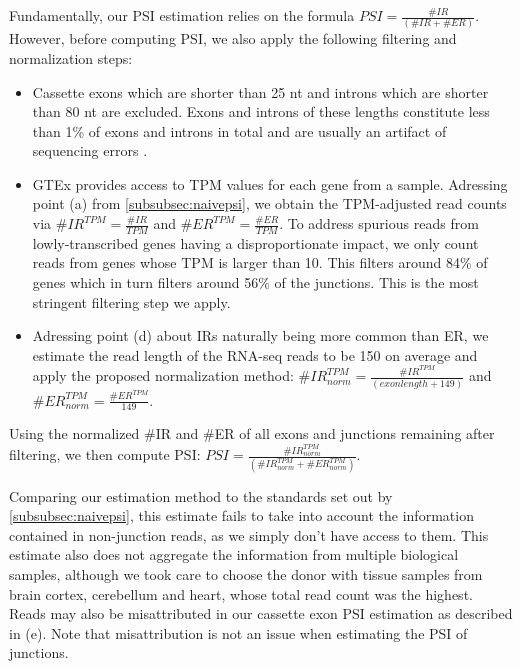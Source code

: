 Fundamentally, our PSI estimation relies on the formula $PSI = \frac{\#IR}{(\#IR+\#ER)}$. However, before computing PSI, we also apply the following filtering and normalization steps:
\begin{itemize}
	\item Cassette exons which are shorter than 25 nt and introns which are shorter than 80 nt are excluded. Exons and introns of these lengths constitute less than 1\% of exons and introns in total and are usually an artifact of sequencing errors \cite{dsc}.
	\item GTEx provides access to TPM values for each gene from a sample. Adressing point (a) from \ref{subsubsec:naivepsi}, we obtain the TPM-adjusted read counts via $\#IR^{TPM} = \frac{\#IR}{TPM}$ and $\#ER^{TPM} = \frac{\#ER}{TPM}$. To address spurious reads from lowly-transcribed genes having a disproportionate impact, we only count reads from genes whose TPM is larger than 10. This filters around 84\% of genes which in turn filters around 56\% of the junctions. This is the most stringent filtering step we apply. 
	
	\item Adressing point (d) about IRs naturally being more common than ER, we estimate the read length of the RNA-seq reads to be 150 on average \cite{gtex_read_length} and apply the proposed normalization method: $\#IR^{TPM}_{norm} = \frac{\#IR^{TPM}}{(exon length + 149)}$ and $\#ER^{TPM}_{norm} = \frac{\#ER^{TPM}}{149}$.
\end{itemize}

Using the normalized \#IR and \#ER of all exons and junctions remaining after filtering, we then compute PSI: $PSI = \frac{\#IR^{TPM}_{norm}}{(\#IR^{TPM}_{norm}+\#ER^{TPM}_{norm})}$. 

Comparing our estimation method to the standards set out by \ref{subsubsec:naivepsi}, this estimate fails to take into account the information contained in non-junction reads, as we simply don't have access to them.
This estimate also does not aggregate the information from multiple biological samples, although we took care to choose the donor with tissue samples from brain cortex, cerebellum and heart, whose total read count was the highest. 
Reads may also be misattributed in our cassette exon PSI estimation as described in (e). Note that misattribution is not an issue when estimating the PSI of junctions.

